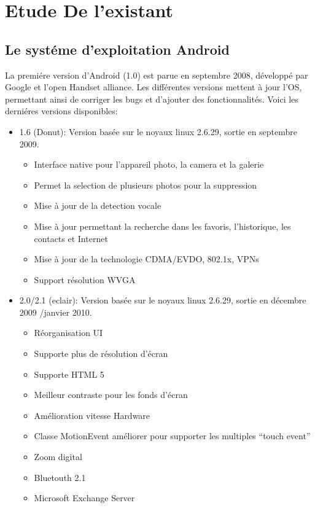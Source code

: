 \chapter{Etude De l'existant}
\section{Le systéme d'exploitation Android}La premiére version d'Android (1.0)
est parue en septembre 2008, développé par Google et l'open Handset alliance.
Les différentes versions mettent à jour l'OS, permettant ainsi de corriger les
bugs et d'ajouter des fonctionnalités. Voici les derniéres versions disponibles:
\begin{itemize}
  \item 1.6 (Donut):
  Version basée sur le noyaux linux 2.6.29, sortie en septembre 2009.
  \begin{itemize}
    \item Interface native pour l'appareil photo, la camera et la galerie
    \item Permet la selection de plusieurs photos pour la suppression
    \item Mise à jour de la detection vocale
    \item Mise à jour permettant la recherche dans les favoris, l'historique, les contacts 
    et Internet
    \item Mise à jour de la technologie CDMA/EVDO, 802.1x, VPNs
    \item Support résolution WVGA
  \end{itemize}
  \item 2.0/2.1 (eclair):
  Version basée sur le noyaux linux 2.6.29, sortie en décembre 2009 /janvier
  2010.
  \begin{itemize}
    \item Réorganisation UI
    \item Supporte plus de résolution d'écran
    \item Supporte HTML 5
    \item Meilleur contraste pour les fonds d'écran
    \item Amélioration vitesse Hardware
    \item Classe MotionEvent améliorer pour supporter les multiples ``touch event''
    \item Zoom digital
    \item Bluetouth 2.1
    \item Microsoft Exchange Server
  \end{itemize}
  

\end{itemize}
